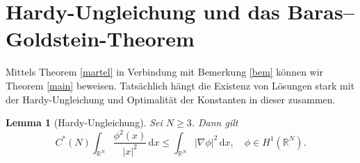 \documentclass[11pt,twoside,a4paper]{article}
\newtheorem{lem}[thm]{Lemma}
\theoremstyle{break}
\begin{document}
\section{Hardy-Ungleichung und das Baras--Goldstein-Theorem}
Mittels Theorem \ref{martel} in Verbindung mit Bemerkung \ref{bem} können wir Theorem  \ref{main} beweisen. Tatsächlich hängt die Existenz von Lösungen stark mit der Hardy-Ungleichung und Optimalität der Konstanten in dieser zusammen.
\begin{lem}[Hardy-Ungleichung]
Sei $N\ge 3$. Dann gilt
\begin{equation}\label{hardy}
C^*(N) \int_{\mathbb R^N} \frac{\phi^2(x)}{|x|^2}\, \mathrm dx \le \int_{\mathbb R^N} |\nabla \phi|^2\, \mathrm dx, \quad \phi \in H^1(\mathbb R^N).
\end{equation}
\end{lem}
\end{document}
